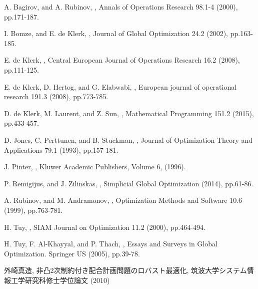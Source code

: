\documentclass[a4paper,11pt]{jreport}
\begin{document}
\begin{thebibliography}{1}

A. Bagirov, and A. Rubinov,
,
\newblock Annals of Operations Research 98.1-4 (2000), pp.171-187.

I. Bomze, and E. de Klerk,
,
\newblock Journal of Global Optimization 24.2 (2002), pp.163-185.

E. de Klerk,
,
\newblock Central European Journal of Operations Research 16.2 (2008), pp.111-125.

E. de Klerk, D. Hertog, and G. Elabwabi,
,
\newblock European journal of operational research 191.3 (2008), pp.773-785.

D. de Klerk, M. Laurent, and Z. Sun,
,
\newblock Mathematical Programming 151.2 (2015), pp.433-457.

D. Jones, C. Perttunen, and B. Stuckman,
,
\newblock Journal of Optimization Theory and Applications 79.1 (1993), pp.157-181.

J. Pinter,
,
\newblock Kluwer Academic Publishers, Volume 6, (1996).

P. Remigijus, and J. Zilinskas,
,
\newblock Simplicial Global Optimization (2014), pp.61-86.

A. Rubinov, and M. Andramonov,
,
\newblock Optimization Methods and Software 10.6 (1999), pp.763-781.

H. Tuy,
,
\newblock SIAM Journal on Optimization 11.2 (2000), pp.464-494.

H. Tuy, F. Al-Khayyal, and P. Thach,
,
\newblock Essays and Surveys in Global Optimization. Springer US (2005), pp.39-78.

外崎真造,
\newblock 非凸2次制約付き配合計画問題のロバスト最適化,
\newblock 筑波大学システム情報工学研究科修士学位論文 (2010)

\end{thebibliography}
\end{document}
